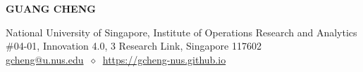 \documentclass[12pt, a4paper]{article}
\begin{document}



\thispagestyle{firstpage}

{\par \centering\MakeUppercase{\Large\bf Guang Cheng} \par}
\vspace*{-2mm}
\centering
\footnotesize{National University of Singapore, Institute of Operations Research and Analytics} \\
\footnotesize{\#04-01, Innovation 4.0, 3 Research Link, Singapore 117602} \\
\footnotesize{\href{mailto:gcheng@u.nus.edu}{gcheng@u.nus.edu}} $\ \diamond \ $ \footnotesize{\href{https://gcheng-nus.github.io}{https://gcheng-nus.github.io}}
\end{document}
